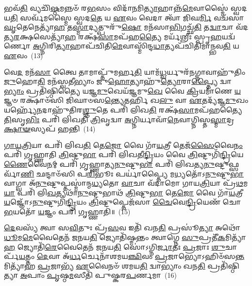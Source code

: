𑌭𑌵᳴\-\ul{𑌤𑌿} 𑌵𑍍𑌯𑌚𑌿᳴\-\ul{𑌷𑍍𑌠}\-𑌮𑌨𑍍𑌨𑍞᳴ 𑌰\-\ul{𑌭}\-𑌸𑌂 𑌵𑌿𑌦𑌾᳴\-\ul{𑌨}\-𑌮𑌿\-\ul{𑌤𑍍𑌯𑌾}\-𑌹𑌾𑌨𑍍𑌨᳴\-\ul{𑌮𑍇}\-𑌵𑌾𑌸𑍍𑌮𑍈॑ 𑌸𑍍𑌵𑌦𑌯\-\ul{𑌤𑌿} 𑌸𑌰𑍍𑌵᳴𑌮𑌸𑍍𑌮𑍈 𑌸𑍍𑌵𑌦\-\ul{𑌤𑍇} 𑌯 \ul{𑌏}\-𑌵𑌂 𑌵𑍇𑌦𑌾 𑌤𑍍𑌵𑌾᳴ 𑌜𑌿𑌘\-\ul{𑌰𑍍𑌮𑌿} 𑌵𑌚᳴𑌸𑌾 \ul{𑌘𑍃}\-𑌤𑍇𑌨𑍇𑌤𑍍𑌯𑌾᳴\-\ul{𑌹} 𑌤\-\ul{𑌸𑍍𑌮𑌾}\-𑌦𑍍𑌯𑌤𑍍𑌪𑍁𑌰𑍁᳴\-\ul{𑌷𑍋} 𑌮𑌨᳴𑌸𑌾\-\ul{𑌭𑌿}\-𑌗𑌚𑍍𑌛᳴\-\ul{𑌤𑌿} 𑌤\-\ul{𑌦𑍍𑌵𑌾}\-𑌚𑌾 𑌵᳴𑌦𑌤𑍍𑌯\-\ul{𑌰}\-𑌕𑍍𑌷𑌸𑍇𑌤𑍍𑌯𑌾᳴\-\ul{𑌹} 𑌰𑌕𑍍𑌷᳴\-\ul{𑌸𑌾}\-𑌮𑌪᳴𑌹\-\ul{𑌤𑍍𑌯𑍈} 𑌮𑌰𑍍𑌯᳴𑌶𑍍𑌰𑍀𑌃 𑌸𑍍𑌪𑍃\-\ul{𑌹}\-𑌯𑌦𑍍𑌵᳴𑌰𑍍𑌣𑍋 \ul{𑌅}\-𑌗𑍍𑌨𑌿𑌰𑌿\-\ul{𑌤𑍍𑌯𑌾}\-𑌹𑌾𑌪᳴𑌚𑌿𑌤𑌿\-\ul{𑌮𑍇}\-𑌵𑌾𑌸𑍍𑌮𑌿᳴𑌨𑍍𑌦\-\ul{𑌧𑌾}\-𑌤𑍍𑌯𑌪᳴𑌚𑌿𑌤𑌿𑌮𑌾𑌨𑍍𑌭𑌵\-\ul{𑌤𑌿} 𑌯 \ul{𑌏}\-𑌵𑌂~(13)

𑌵𑍇\-\ul{𑌦} 𑌮𑌨᳴\-\ul{𑌸𑌾} 𑌤𑍍𑌵𑍈 𑌤𑌾𑌮𑌾𑌪𑍍𑌤𑍁᳴𑌮𑌰𑍍\mbox{}𑌹\-\ul{𑌤𑌿} 𑌯𑌾𑌮᳴\-\ul{𑌧𑍍𑌵}\-𑌰𑍍𑌯𑍁𑌰᳴\-\ul{𑌨}\-𑌗𑍍𑌨𑌾𑌵𑌾𑌹𑍁᳴𑌤𑌿𑌂 \ul{𑌜𑍁}\-𑌹𑍋\-\ul{𑌤𑌿} 𑌮𑌨᳴𑌸𑍍𑌵𑌤𑍀𑌭𑍍𑌯𑌾𑌂 𑌜𑍁\-\ul{𑌹𑍋}\-𑌤𑍍𑌯𑌾𑌹𑍁᳴\-\ul{𑌤𑍍𑌯𑍋}\-𑌰𑌾\-\ul{𑌪𑍍𑌤𑍍𑌯𑍈} 𑌦𑍍𑌵𑌾\-\ul{𑌭𑍍𑌯𑌾𑌂} 𑌪𑍍𑌰𑌤𑌿᳴𑌷𑍍𑌠𑌿𑌤𑍍𑌯𑍈 𑌯𑌜𑍍𑌞\-\ul{𑌮𑍁}\-𑌖𑍇𑌯᳴𑌜𑍍𑌞𑌮𑍁\-\ul{𑌖𑍇} 𑌵𑍈 \ul{𑌕𑍍𑌰𑌿}\-𑌯𑌮𑌾᳴𑌣𑍇 \ul{𑌯}\-𑌜𑍍𑌞𑍞 𑌰𑌕𑍍𑌷𑌾𑍞᳴𑌸𑌿 𑌜𑌿𑌘𑌾𑍞𑌸\-\ul{𑌨𑍍𑌤𑍍𑌯𑍇}\-𑌤𑌰𑍍\mbox{}\-\ul{𑌹𑌿} 𑌖\-\ul{𑌲𑍁} 𑌵𑌾 \ul{𑌏}\-𑌤𑌦𑍍𑌯᳴𑌜𑍍𑌞\-\ul{𑌮𑍁}\-𑌖𑌂 𑌯𑌰𑍍\mbox{}𑌹𑍍𑌯𑍇᳴\-\ul{𑌨}\-𑌦𑌾𑌹𑍁᳴𑌤𑌿𑌰\-\ul{𑌶𑍍𑌞𑍁}\-𑌤𑍇 𑌪𑌰𑌿᳴ 𑌲𑌿𑌖\-\ul{𑌤𑌿} 𑌰𑌕𑍍𑌷᳴\-\ul{𑌸𑌾}\-𑌮𑌪᳴𑌹𑌤𑍍𑌯𑍈 \ul{𑌤𑌿}\-𑌸𑍃\-\ul{𑌭𑌿𑌃} 𑌪𑌰𑌿᳴ 𑌲𑌿𑌖𑌤𑌿 \ul{𑌤𑍍𑌰𑌿}\-𑌵𑍃𑌦𑍍𑌵𑌾 \ul{𑌅}\-𑌗𑍍𑌨𑌿𑌰𑍍𑌯𑌾𑌵𑌾᳴\-\ul{𑌨𑍇}\-𑌵𑌾𑌗𑍍𑌨𑌿𑌸𑍍𑌤\-\ul{𑌸𑍍𑌮𑌾}\-𑌦𑍍𑌰\-\ul{𑌕𑍍𑌷𑌾}\-\-\ul{𑍟}\-𑌸𑍍𑌯𑌪᳴ 𑌹𑌨𑍍𑌤𑌿~(14)

\-\ul{𑌗𑌾}\-\-\ul{𑌯}\-\-\ul{𑌤𑍍𑌰𑌿}\-𑌯𑌾 𑌪𑌰𑌿᳴ 𑌲𑌿𑌖\-\ul{𑌤𑌿} 𑌤𑍇\-\ul{𑌜𑍋} 𑌵𑍈 𑌗𑌾᳴\-\ul{𑌯}\-𑌤𑍍𑌰𑍀 𑌤𑍇𑌜᳴\-\ul{𑌸𑍈}\-𑌵𑍈\-\ul{𑌨𑌂} 𑌪𑌰𑌿᳴ 𑌗𑍃𑌹𑍍𑌣𑌾𑌤𑌿 \ul{𑌤𑍍𑌰𑌿}\-𑌷𑍍𑌟𑍁\-\ul{𑌭𑌾} 𑌪𑌰𑌿᳴ 𑌲𑌿𑌖𑌤𑍀\-\ul{𑌨𑍍𑌦𑍍𑌰𑌿}\-𑌯𑌂 𑌵𑍈 \ul{𑌤𑍍𑌰𑌿}\-𑌷𑍍𑌟𑍁𑌗𑌿᳴\-\ul{𑌨𑍍𑌦𑍍𑌰𑌿}\-𑌯𑍇\-\ul{𑌣𑍈}\-𑌵𑍈\-\ul{𑌨}\-𑌮𑍍 𑌪𑌰𑌿᳴ 𑌗𑍃𑌹𑍍𑌣𑌾𑌤𑍍𑌯\-\ul{𑌨𑍁}\-𑌷𑍍𑌟𑍁\-\ul{𑌭𑌾} 𑌪𑌰𑌿᳴ 𑌲𑌿𑌖𑌤𑍍𑌯\-\ul{𑌨𑍁}\-𑌷𑍍𑌟𑍁𑌫𑍍𑌸𑌰𑍍𑌵𑌾᳴\-\ul{𑌣𑌿} 𑌛𑌨𑍍𑌦𑌾𑍞᳴𑌸𑌿 𑌪\-\ul{𑌰𑌿}\-𑌭𑍂𑌃 𑌪𑌰𑍍𑌯𑌾॑𑌪𑍍𑌤𑍍𑌯𑍈 𑌮\-\ul{𑌧𑍍𑌯}\-𑌤𑍋᳴\-𑌽\-\ul{𑌨𑍁}\-𑌷𑍍𑌟𑍁\-\ul{𑌭𑌾} 𑌵𑌾𑌗𑍍𑌵𑌾 𑌅᳴\-\ul{𑌨𑍁}\-𑌷𑍍𑌟𑍁𑌪𑍍𑌤𑌸𑍍𑌮𑌾॑𑌨𑍍𑌮\-\ul{𑌧𑍍𑌯}\-𑌤𑍋 \ul{𑌵𑌾}\-𑌚𑌾 𑌵᳴𑌦𑌾𑌮𑍋 𑌗𑌾𑌯\-\ul{𑌤𑍍𑌰𑌿}\-𑌯𑌾 𑌪𑍍𑌰᳴\-\ul{𑌥}\-𑌮\-\ul{𑌯𑌾} 𑌪𑌰𑌿᳴ 𑌲𑌿\-\ul{𑌖}\-𑌤𑍍𑌯𑌥𑌾᳴\-\ul{𑌨𑍁}\-𑌷𑍍𑌟𑍁𑌭𑌾𑌥᳴ \ul{𑌤𑍍𑌰𑌿}\-𑌷𑍍𑌟𑍁\-\ul{𑌭𑌾} 𑌤𑍇\-\ul{𑌜𑍋} 𑌵𑍈 𑌗𑌾᳴\-\ul{𑌯}\-𑌤𑍍𑌰𑍀 \ul{𑌯}\-𑌜𑍍𑌞𑍋᳴\-𑌽\-\ul{𑌨𑍁}\-𑌷𑍍𑌟𑍁𑌗𑌿᳴\-\ul{𑌨𑍍𑌦𑍍𑌰𑌿}\-𑌯𑌂 \ul{𑌤𑍍𑌰𑌿}\-𑌷𑍍𑌟𑍁𑌪𑍍𑌤𑍇𑌜᳴𑌸𑌾 \ul{𑌚𑍈}\-𑌵𑍇\-\ul{𑌨𑍍𑌦𑍍𑌰𑌿}\-𑌯𑍇𑌣᳴ 𑌚𑍋\-\ul{𑌭}\-𑌯𑌤𑍋᳴ \ul{𑌯}\-𑌜𑍍𑌞𑌂 𑌪𑌰𑌿᳴ 𑌗𑍃𑌹𑍍𑌣𑌾𑌤𑌿॥~(15)

{\anuvakamend[{\-\ul{𑌅}\-𑌨𑍍𑌧𑍋॑\-𑌽\-\ul{𑌧𑍍𑌵}\-𑌰𑍍𑌯𑍁\-\ul{𑌰𑍍𑌮}\-𑌹𑌾𑌨𑍍𑌭᳴𑌵𑌤𑌿 \ul{𑌤𑍍𑌰𑌿}\-𑌷𑍍𑌟𑍁\-\ul{𑌭𑌾} 𑌤𑍇\-\ul{𑌜𑍋} 𑌵𑍈 𑌗𑌾᳴\-\ul{𑌯}\-𑌤𑍍𑌰𑍀 𑌤𑍍𑌰𑌯𑍋᳴𑌦𑌶 𑌚}]}%

\-\ul{𑌦𑍇}\-𑌵𑌸𑍍𑌯᳴ 𑌤𑍍𑌵𑌾 𑌸\-\ul{𑌵𑌿}\-𑌤𑍁𑌃 𑌪𑍍𑌰᳴\-\ul{𑌸}\-𑌵 𑌇𑌤𑌿᳴ 𑌖𑌨\-\ul{𑌤𑌿} 𑌪𑍍𑌰𑌸𑍂॑\-\ul{𑌤𑍍𑌯𑌾} 𑌅𑌥𑍋᳴ \ul{𑌧𑍂}\-𑌮\-\ul{𑌮𑍇}\-𑌵𑍈𑌤𑍇𑌨᳴ 𑌜𑌨𑌯\-\ul{𑌤𑌿} 𑌜𑍍𑌯𑍋𑌤𑌿᳴𑌷𑍍𑌮𑌨𑍍𑌤𑌂 𑌤𑍍𑌵𑌾𑌗𑍍𑌨𑍇 \ul{𑌸𑍁}\-𑌪𑍍𑌰𑌤𑍀᳴\-\ul{𑌕}\-𑌮𑌿𑌤𑍍𑌯𑌾᳴\-\ul{𑌹} 𑌜𑍍𑌯𑍋𑌤𑌿᳴\-\ul{𑌰𑍇}\-𑌵𑍈𑌤𑍇𑌨᳴ 𑌜𑌨𑌯\-\ul{𑌤𑌿} 𑌸𑍋॑\-𑌽𑌗𑍍𑌨𑌿\-\ul{𑌰𑍍𑌜𑌾}\-𑌤𑌃 \ul{𑌪𑍍𑌰}\-𑌜𑌾𑌃 \ul{𑌶𑍁}\-𑌚𑌾𑌰𑍍𑌪᳴\-\ul{𑌯}\-𑌤𑍍𑌤𑌂 \ul{𑌦𑍇}\-𑌵𑌾 𑌅᳴\-\ul{𑌰𑍍𑌧}\-𑌰𑍍𑌚𑍇𑌨𑌾᳴𑌶𑌮𑌯\-\ul{𑌞𑍍𑌛𑌿}\-𑌵𑌂 \ul{𑌪𑍍𑌰}\-𑌜𑌾𑌭𑍍𑌯𑍋\-𑌽𑌹𑌿𑍞᳴𑌸\-\ul{𑌨𑍍𑌤}\-𑌮𑌿𑌤𑍍𑌯𑌾᳴𑌹 \ul{𑌪𑍍𑌰}\-𑌜𑌾𑌭𑍍𑌯᳴ \ul{𑌏}\-𑌵𑍈𑌨𑍞᳴ 𑌶𑌮𑌯\-\ul{𑌤𑌿} 𑌦𑍍𑌵𑌾\-𑌭𑍍𑌯𑌾𑌂॑ 𑌖𑌨\-\ul{𑌤𑌿} 𑌪𑍍𑌰𑌤𑌿᳴𑌷𑍍𑌠𑌿𑌤𑍍𑌯𑌾 \ul{𑌅}\-𑌪𑌾𑌂 \ul{𑌪𑍃}\-𑌷𑍍𑌠\-\ul{𑌮}\-𑌸𑍀𑌤𑌿᳴ 𑌪𑍁𑌷𑍍𑌕𑌰\-\ul{𑌪}\-𑌰𑍍𑌣𑌮𑌾~(16)

